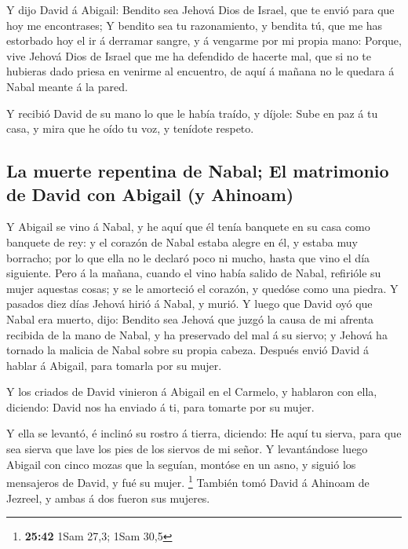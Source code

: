  Y dijo David á Abigail: Bendito sea Jehová Dios de Israel,
que te envió para que hoy me encontrases;  Y bendito sea tu
razonamiento, y bendita tú, que me has estorbado hoy el ir á derramar
sangre, y á vengarme por mi propia mano:  Porque, vive
Jehová Dios de Israel que me ha defendido de hacerte mal, que si no te
hubieras dado priesa en venirme al encuentro, de aquí á mañana no le
quedara á Nabal meante á la pared.

 Y recibió David de su mano lo que le había traído, y
díjole: Sube en paz á tu casa, y mira que he oído tu voz, y tenídote
respeto.

\hypertarget{la-muerte-repentina-de-nabal-el-matrimonio-de-david-con-abigail-y-ahinoam}{%
\subsection{La muerte repentina de Nabal; El matrimonio de David con
Abigail (y
Ahinoam)}\label{la-muerte-repentina-de-nabal-el-matrimonio-de-david-con-abigail-y-ahinoam}}

 Y Abigail se vino á Nabal, y he aquí que él tenía banquete
en su casa como banquete de rey: y el corazón de Nabal estaba alegre en
él, y estaba muy borracho; por lo que ella no le declaró poco ni mucho,
hasta que vino el día siguiente.  Pero á la mañana, cuando
el vino había salido de Nabal, refirióle su mujer aquestas cosas; y se
le amorteció el corazón, y quedóse como una piedra.  Y
pasados diez días Jehová hirió á Nabal, y murió.  Y luego
que David oyó que Nabal era muerto, dijo: Bendito sea Jehová que juzgó
la causa de mi afrenta recibida de la mano de Nabal, y ha preservado del
mal á su siervo; y Jehová ha tornado la malicia de Nabal sobre su propia
cabeza. Después envió David á hablar á Abigail, para tomarla por su
mujer.

 Y los criados de David vinieron á Abigail en el Carmelo, y
hablaron con ella, diciendo: David nos ha enviado á ti, para tomarte por
su mujer.

 Y ella se levantó, é inclinó su rostro á tierra, diciendo:
He aquí tu sierva, para que sea sierva que lave los pies de los siervos
de mi señor.  Y levantándose luego Abigail con cinco mozas
que la seguían, montóse en un asno, y siguió los mensajeros de David, y
fué su mujer. \footnote{\textbf{25:42} 1Sam 27,3; 1Sam 30,5}
 También tomó David á Ahinoam de Jezreel, y ambas á dos
fueron sus mujeres.

